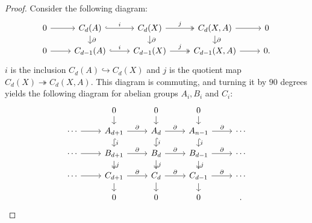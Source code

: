 \documentclass{amsart}
\begin{document}
\begin{proof}
Consider the following diagram:
\begin{equation}
\begin{tikzcd}[row sep=1em]
0 \arrow[r] & C_d(A) \arrow[r, "i", hook] \arrow[d, "\partial"] & C_d(X) \arrow[r, "j", two heads] \arrow[d, "\partial"] & {C_d(X,A)} \arrow[r] \arrow[d, "\partial"] & 0 \\
0 \arrow[r] & C_{d-1}(A) \arrow[r, "i", hook]                               & C_{d-1}(X) \arrow[r, "j", two heads]                               & {C_{d-1}(X,A)} \arrow[r]                               & 0.
\end{tikzcd}
\end{equation}
$i$ is the inclusion $C_d(A) \hookrightarrow C_d(X)$ and $j$ is the quotient map $C_d(X) \twoheadrightarrow C_d(X,A)$. This diagram is commuting, and turning it by $90$ degrees yields the following diagram for abelian groups $A_i, B_i$ and $C_i$:
\begin{equation}
\begin{tikzcd}[row sep=1em]
                 & 0 \arrow[d]                                                         & 0 \arrow[d]                                                     & 0 \arrow[d]                                                         &        \\
\cdots \arrow[r] & A_{d+1} \arrow[r, "\partial"] \arrow[d, "i", hook]      & A_d \arrow[r, "\partial"] \arrow[d, "i", hook]      & A_{n-1} \arrow[r, "\partial"] \arrow[d, "i", hook]      & \cdots \\
\cdots \arrow[r] & B_{d+1} \arrow[r, "\partial"] \arrow[d, "j", two heads] & B_d \arrow[r, "\partial"] \arrow[d, "j", two heads] & B_{d-1} \arrow[r, "\partial"] \arrow[d, "j", two heads] & \cdots \\
\cdots \arrow[r] & C_{d+1} \arrow[r, "\partial"] \arrow[d]                             & C_d \arrow[r, "\partial"] \arrow[d]                             & C_{d-1} \arrow[r, "\partial"] \arrow[d]                             & \cdots \\
                 & 0                                                                   & 0                                                               & 0                                                                   &       .
\end{tikzcd}
\end{equation}

\end{proof}
\end{document}
